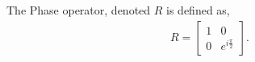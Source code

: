 The Phase operator, denoted $R$ is defined as,
\begin{align*}
    R =
    \begin{bmatrix}
        1 & 0                  \\
        0 & e^{i\frac{\pi}{2}}
    \end{bmatrix}.
\end{align*}








% 


